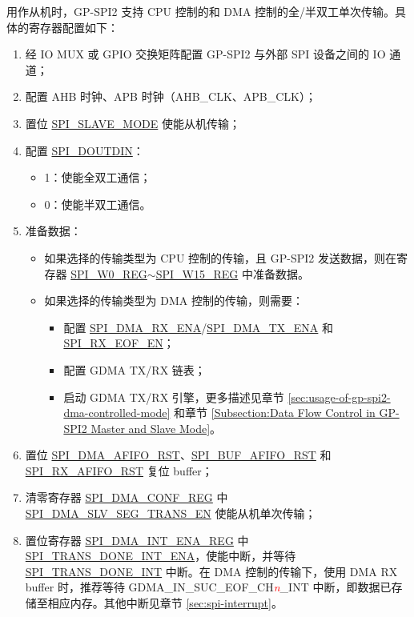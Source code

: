 \documentclass[main\_\_CN.tex]{subfiles}
\begin{document}
用作从机时，GP-SPI2 支持 CPU 控制的和 DMA 控制的全/半双工单次传输。具体的寄存器配置如下：
\begin{enumerate}
    \item 经 IO MUX 或 GPIO 交换矩阵配置 GP-SPI2 与外部 SPI 设备之间的 IO 通道；

    \item 配置 AHB 时钟、APB 时钟（AHB\_CLK、APB\_CLK）；

    \item 置位 \hyperref[fielddesc:SPISLAVEMODE]{SPI\_SLAVE\_MODE} 使能从机传输；

    \item 配置 \hyperref[fielddesc:SPIDOUTDIN]{SPI\_DOUTDIN}：
    \begin{itemize}
        \item 1：使能全双工通信；
        \item 0：使能半双工通信。
    \end{itemize}

    \item 准备数据：
    \begin{itemize}
        \item 如果选择的传输类型为 CPU 控制的传输，且 GP-SPI2 发送数据，则在寄存器 \hyperref[regdesc:SPIW0REG]{SPI\_W0\_REG}$\sim$\hyperref[regdesc:SPIW15REG]{SPI\_W15\_REG} 中准备数据。
        \item 如果选择的传输类型为 DMA 控制的传输，则需要：
        \begin{itemize}
            \item 配置 \hyperref[fielddesc:SPIDMARXENA]{SPI\_DMA\_RX\_ENA}/\hyperref[fielddesc:SPIDMATXENA]{SPI\_DMA\_TX\_ENA} 和 \hyperref[fielddesc:SPIRXEOFEN]{SPI\_RX\_EOF\_EN}；
            \item 配置 GDMA TX/RX 链表；
            \item 启动 GDMA TX/RX 引擎，更多描述见章节  \ref{sec:usage-of-gp-spi2-dma-controlled-mode} 和章节  \ref{Subsection:Data Flow Control in GP-SPI2 Master and Slave Mode}。
        \end{itemize}
    \end{itemize}

    \item 置位 \hyperref[fielddesc:SPIDMAAFIFORST]{SPI\_DMA\_AFIFO\_RST}、\hyperref[fielddesc:SPIBUFAFIFORST]{SPI\_BUF\_AFIFO\_RST} 和 \hyperref[fielddesc:SPIRXAFIFORST]{SPI\_RX\_AFIFO\_RST} 复位 buffer；

    \item 清零寄存器 \hyperref[regdesc:SPIDMACONFREG]{SPI\_DMA\_CONF\_REG} 中 \hyperref[fielddesc:SPIDMASLVSEGTRANSEN]{SPI\_DMA\_SLV\_SEG\_TRANS\_EN} 使能从机单次传输；

    \item 置位寄存器 \hyperref[regdesc:SPIDMAINTENAREG]{SPI\_DMA\_INT\_ENA\_REG} 中 \hyperref[fielddesc:SPITRANSDONEINTENA]{SPI\_TRANS\_DONE\_INT\_ENA}，使能中断，并等待 \hyperref[int:SPITRANSDONEINT]{SPI\_TRANS\_DONE\_INT} 中断。在 DMA 控制的传输下，使用 DMA RX buffer 时，推荐等待 GDMA\_IN\_SUC\_EOF\_CH\textcolor{red}{\it{n}}\_INT 中断，即数据已存储至相应内存。其他中断见章节 \ref{sec:spi-interrupt}。
\end{enumerate}
\end{document}
